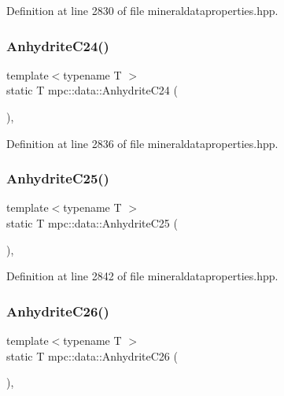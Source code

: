 Definition at line 2830 of file mineraldataproperties.\+hpp.

\mbox{\label{namespacempc_1_1data_a20976b2177d00b449d6963e942eea39d}} 
\subsubsection{\texorpdfstring{Anhydrite\+C24()}{AnhydriteC24()}}
{\footnotesize\ttfamily template$<$typename T $>$ \\
static T mpc\+::data\+::\+Anhydrite\+C24 (\begin{DoxyParamCaption}{ }\end{DoxyParamCaption})\hspace{0.3cm}{\ttfamily [inline]}, {\ttfamily [static]}}



Definition at line 2836 of file mineraldataproperties.\+hpp.

\mbox{\label{namespacempc_1_1data_af25c6e06b9e864df330bf8ea4546ad22}} 
\subsubsection{\texorpdfstring{Anhydrite\+C25()}{AnhydriteC25()}}
{\footnotesize\ttfamily template$<$typename T $>$ \\
static T mpc\+::data\+::\+Anhydrite\+C25 (\begin{DoxyParamCaption}{ }\end{DoxyParamCaption})\hspace{0.3cm}{\ttfamily [inline]}, {\ttfamily [static]}}



Definition at line 2842 of file mineraldataproperties.\+hpp.

\mbox{\label{namespacempc_1_1data_a3d04b179c84211be0425d76831d73f93}} 
\subsubsection{\texorpdfstring{Anhydrite\+C26()}{AnhydriteC26()}}
{\footnotesize\ttfamily template$<$typename T $>$ \\
static T mpc\+::data\+::\+Anhydrite\+C26 (\begin{DoxyParamCaption}{ }\end{DoxyParamCaption})\hspace{0.3cm}{\ttfamily [inline]}, {\ttfamily [static]}}



